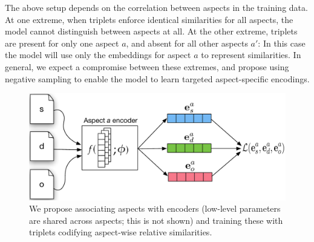 \documentclass[11pt,a4paper]{article}
\begin{document}

The above setup depends on the correlation between aspects in the training data. At one extreme, when triplets enforce identical similarities for all aspects, the model cannot distinguish between aspects at all. At the other extreme, triplets are present for only one aspect $a$, and absent for all other aspects $a'$: 
In this case the model will use only the embeddings for aspect $a$ to represent similarities.
In general, we expect a compromise between these extremes, and propose using negative sampling to enable the model to learn targeted aspect-specific encodings.%



\begin{figure}
	\centering
    \includegraphics[width=\columnwidth]{figures/disentangle.pdf}
    \vspace{-1.5em}
    \caption{We propose associating aspects with encoders (low-level parameters are shared across aspects; this is not shown) and training these with triplets codifying aspect-wise relative similarities.}%
    \label{fig:the-idea}
    \vspace{-.75em}
\end{figure}
\end{document}
